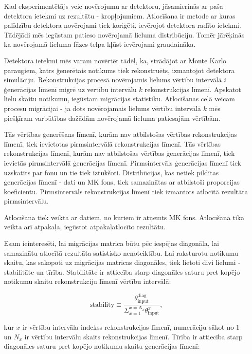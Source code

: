 Kad eksperimentētājs veic novērojumu ar detektoru, jāsamierinās ar paša detektora ietekmi uz rezultātu - kropļojumiem. \gls{Atlocīšana} ir metode ar kuras palīdzību detektora novērojami tiek koriģēti, ievērojot detektora radīto ietekmi. Tādējādi mēs iegūstam patieso novērojamā lieluma distribūciju. Tomēr jārēķinās ka novērojamā lieluma fāzes-telpa kļūst ievērojami graudaināka. 

Detektora ietekmi mēs varam novērtēt tādēļ, ka, strādājot ar Monte Karlo paraugiem, katrs ģenerētais notikums tiek rekonstruēts, izmantojot detektora simulāciju. Rekonstrukcijas procesā novērojamis lielums vērtību intervālā $i$ ģenerācijas līmenī migrē uz vertību intervālu $k$ rekonstrukcijas līmenī. Apskatot lielu skaitu notikumu, iegūstam migrācijas statistiku. Atlocīšanas ceļā veicam procesu migrācijai - ja dots novērojamais lielums vērtību intervālā $k$ mēs piešķīram varbūtības dažādām novērojamā lieluma patiesajām vērtībām.

Tās \pullangle vērtības ģenerēšans līmenī, kurām nav atbilstošas vērtības rekonstrukcijas līmenī, tiek ievietotas pirmsintervālā rekonstrukcijas līmenī. Tās \pullangle vērtības rekonstrukcijas līmenī, kurām nav atbilstošas vērtības ģenerācijas līmenī, tiek ievietās pirmsintervālā ģenerācijas līmenī. Pirmsintervāls ģenerācijas līmenī tiek uzskatīts par fonu un tie tiek iztukšoti. Distribūcijas, kas netiek pildītas ģenerācijas līmenī - dati un MK fons, tiek samazinātas ar atbilstoši proporcijas koeficientu.  Pirmsintervāls rekonstrukcijas līmenī tiek izmantots atlocītā rezultāta pirmsintervālu. 

Atlocīšana tiek veikta ar datiem, no kuriem ir atņemts MK fons. Atlocīšana tika veikta arī atpakaļa, iegūstot atpakaļatlocīto rezultātu. 

Esam ieinteresēti, lai migrācijas matrica būtu pēc iespējas diagonāla, lai samazinātu atlocītā rezultāta satistisko nenoteiktību. Lai raksturotu notikumu skaitu, kas sakopoti uz migrācijas matricas diagonāles, tiek lietoti divi lielumi - stabilitāte un tīrība. Stabilitāte ir attiecība starp diagonāles saturu pret kopējo notikumu skaitu rekonstrukciju līmenī vērtību intervālā:

\begin{equation}
  \text{stability}\equiv\frac{\theta^{\text{diag}}_{\text{input}}}{\Sigma_{x=1}^{x=N_{x}}\theta^{x}_{\text{input}}},
\end{equation}

kur $x$ ir vērtību intervāla indekss rekonstrukcijas līmenī, numerāciju sākot no 1 un $N_{x}$ ir vērtību intervālu skaits rekonstrukcijas līmenī. Tīrība ir attiecība starp diagonāles saturu pret kopējo notikumu skaitu ģenerācijas līmenī:

